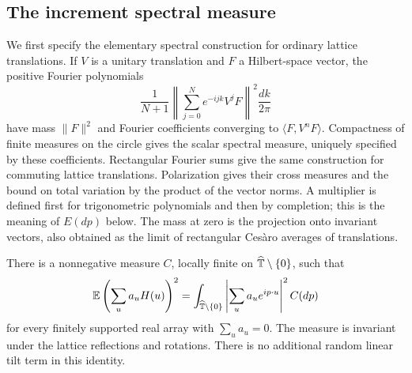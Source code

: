 \subsection{The increment spectral measure}

We first specify the elementary spectral construction for ordinary lattice
translations. If $V$ is a unitary translation and $F$ a Hilbert-space
vector, the positive Fourier polynomials
\[
 \frac1{N+1}\left\|\sum_{j=0}^N e^{-ijk}V^jF\right\|^2
             \frac{dk}{2\pi}
\]
have mass $\|F\|^2$ and Fourier coefficients converging to
$\langle F,V^nF\rangle$.  Compactness of finite measures on the circle
gives the scalar spectral measure, uniquely specified by these
coefficients.  Rectangular Fourier sums give the same construction for
commuting lattice translations.  Polarization gives their cross
measures and the bound on total variation by the product of the vector
norms.  A multiplier is defined first for trigonometric polynomials and
then by completion; this is the meaning of $E(dp)$ below.  The mass at
zero is the projection onto invariant vectors, also obtained as the
limit of rectangular Ces\`aro averages of translations.

\begin{lemma}
\label{lem:increment-spectral}
There is a nonnegative measure \(C\), locally finite on
\(\widehat{\mathbb T}\setminus\{0\}\), such that
\begin{equation}
 \label{eq:increment-spectral}
 \mathbb E\left(\sum_u a_uH(u)\right)^2
   =\int_{\widehat{\mathbb T}\setminus\{0\}}
      \left|\sum_u a_ue^{ip\cdot u}\right|^2 C(dp)
\end{equation}
for every finitely supported real array with \(\sum_u a_u=0\).
The measure is invariant under the lattice reflections and rotations.
There is no additional random linear tilt term in this identity.
\end{lemma}

